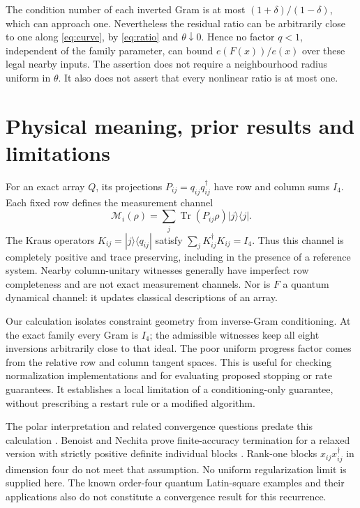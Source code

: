 \documentclass[11pt,a4paper]{article}
\newcommand{\adj}{^{\dagger}}
\DeclareMathOperator{\Tr}{Tr}
\begin{document}
The condition number of each inverted Gram is at most $(1+\delta)/(1-\delta)$, which can approach one. Nevertheless the residual ratio can be arbitrarily close to one along \eqref{eq:curve}, by \eqref{eq:ratio} and $\theta\downarrow0$. Hence no factor $q<1$, independent of the family parameter, can bound $e(F(x))/e(x)$ over these legal nearby inputs. The assertion does not require a neighbourhood radius uniform in $\theta$. It also does not assert that every nonlinear ratio is at most one.

\section{Physical meaning, prior results and limitations}

For an exact array $Q$, its projections $P_{ij}=q_{ij}q_{ij}\adj$ have row and column sums $I_4$. Each fixed row defines the measurement channel
\begin{equation}
 \mathcal M_i(\rho)=\sum_j\Tr(P_{ij}\rho)|j\rangle\langle j|.
 \label{eq:channel}
\end{equation}
The Kraus operators $K_{ij}=|j\rangle\langle q_{ij}|$ satisfy $\sum_jK_{ij}\adj K_{ij}=I_4$. Thus this channel is completely positive and trace preserving, including in the presence of a reference system. Nearby column-unitary witnesses generally have imperfect row completeness and are not exact measurement channels. Nor is $F$ a quantum dynamical channel: it updates classical descriptions of an array.

Our calculation isolates constraint geometry from inverse-Gram conditioning. At the exact family every Gram is $I_4$; the admissible witnesses keep all eight inversions arbitrarily close to that ideal. The poor uniform progress factor comes from the relative row and column tangent spaces. This is useful for checking normalization implementations and for evaluating proposed stopping or rate guarantees. It establishes a local limitation of a conditioning-only guarantee, without prescribing a restart rule or a modified algorithm.

The polar interpretation and related convergence questions predate this calculation \cite[Proposition 5.5 and Conjecture 5.6]{BanicaNechita2017}. Benoist and Nechita prove finite-accuracy termination for a relaxed version with strictly positive definite individual blocks \cite[Appendix A, Proposition A.1]{BenoistNechita2017}. Rank-one blocks $x_{ij}x_{ij}\adj$ in dimension four do not meet that assumption. No uniform regularization limit is supplied here. The known order-four quantum Latin-square examples and their applications \cite{MustoVicary2016} also do not constitute a convergence result for this recurrence.
\end{document}
